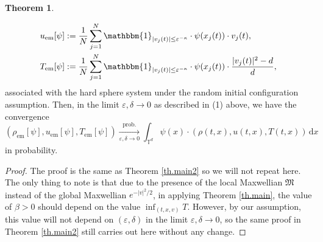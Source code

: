 \documentclass[10pt, reqno]{amsart}
\newcommand{\Tb}{\mathbb T}
\newcommand{\Mf}{\mathfrak M}
\theoremstyle{definition}
\newtheorem{mainthm}{Theorem}
\theoremstyle{remark}
\numberwithin{equation}{section}
\begin{document}
\begin{mainthm}
\begin{enumerate}
\begin{equation}
\begin{aligned}
u_{\mathrm{em}}[\psi]&:=\frac{1}{N}\sum_{j=1}^N \mathbbm{1}_{|v_j(t)|\leq \varepsilon^{-\kappa}}\cdot\psi(x_j(t))\cdot v_j(t),\\
T_{\mathrm{em}}[\psi]&:=\frac{1}{N}\sum_{j=1}^N \mathbbm{1}_{|v_j(t)|\leq \varepsilon^{-\kappa}}\cdot\psi(x_j(t))\cdot\frac{|v_j(t)|^2-d}{d},
\end{aligned}
\end{equation} associated with the hard sphere system under the random initial configuration assumption. Then, in the limit $\varepsilon,\delta\to 0$ as described in (1) above, we have the convergence
\begin{equation}\label{eq.empirical_4}(\rho_{\mathrm{em}}[\psi],u_{\mathrm{em}}[\psi],T_{\mathrm{em}}[\psi])\xrightarrow[\varepsilon,\delta\to 0]{\mathrm{prob.}}\int_{\Tb^d}\psi(x)\cdot(\rho(t,x),u(t,x),T(t,x))\,\mathrm{d}x
\end{equation}
in probability.
\end{enumerate}
\end{mainthm}
\begin{proof} The proof is the same as Theorem \ref{th.main2} so we will not repeat here. The only thing to note is that due to the presence of the local Maxwellian $\Mf$ instead of the global Maxwellian $e^{-|v|^2/2}$, in applying Theorem \ref{th.main}, the value of $\beta>0$ should depend on the value $\inf_{(t,x,v)}T$. However, by our assumption, this value will not depend on $(\varepsilon,\delta)$ in the limit $\varepsilon,\delta\to 0$, so the same proof in Theorem \ref{th.main2} still carries out here without any change.
\end{proof}
\end{document}
